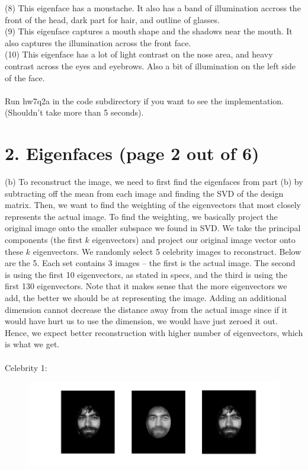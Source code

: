 \documentclass[11pt]{article}
\begin{document}
(8) This eigenface has a moustache. It also has a band of illumination accross the front of the head, dark part for hair, and outline of glasses. \\
(9) This eigenface captures a mouth shape and the shadows near the mouth. It also captures the illumination across the front face. \\
(10) This eigenface has a lot of light contrast on the nose area, and heavy contrast across the eyes and eyebrows. Also a bit of illumination on the left side of the face.
\\\\
Run hw7q2a in the code subdirectory if you want to see the implementation. (Shouldn't take more than 5 seconds).
\newpage

\section*{2. Eigenfaces (page 2 out of 6)}
(b) To reconstruct the image, we need to first find the eigenfaces from part (b) by subtracting off the mean from each image and finding the SVD of the design matrix. Then, we want to find the weighting of the eigenvectors that most closely represents the actual image. To find the weighting, we basically project the original image onto the smaller subspace we found in SVD. We take the principal components (the first $k$ eigenvectors) and project our original image vector onto these $k$ eigenvectors. We randomly select 5 celebrity images to reconstruct. Below are the 5. Each set contains 3 images -- the first is the actual image. The second is using the first 10 eigenvectors, as stated in specs, and the third is using the first 130 eigenvectors. Note that it makes sense that the more eigenvectors we add, the better we should be at representing the image. Adding an additional dimension cannot decrease the distance away from the actual image since if it would have hurt us to use the dimension, we would have just zeroed it out. Hence, we expect better reconstruction with higher number of eigenvectors, which is what we get. \\\\
Celebrity 1:
\begin{figure}[ht!]
\centering
\includegraphics[width=180mm]{images/celeb1.png}
\label{overflow}
\end{figure} \\
\end{document}
